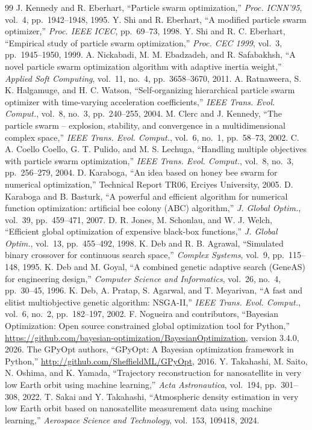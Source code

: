 \documentclass[11pt,a4paper]{article}
\begin{document}
\begin{thebibliography}{99}
 J. Kennedy and R. Eberhart, ``Particle swarm optimization,'' \textit{Proc. ICNN'95}, vol.~4, pp.~1942--1948, 1995.
 Y. Shi and R. Eberhart, ``A modified particle swarm optimizer,'' \textit{Proc. IEEE ICEC}, pp.~69--73, 1998.
 Y. Shi and R. C. Eberhart, ``Empirical study of particle swarm optimization,'' \textit{Proc. CEC 1999}, vol.~3, pp.~1945--1950, 1999.
 A. Nickabadi, M. M. Ebadzadeh, and R. Safabakhsh, ``A novel particle swarm optimization algorithm with adaptive inertia weight,'' \textit{Applied Soft Computing}, vol.~11, no.~4, pp.~3658--3670, 2011.
 A. Ratnaweera, S. K. Halgamuge, and H. C. Watson, ``Self-organizing hierarchical particle swarm optimizer with time-varying acceleration coefficients,'' \textit{IEEE Trans. Evol. Comput.}, vol.~8, no.~3, pp.~240--255, 2004.
 M. Clerc and J. Kennedy, ``The particle swarm -- explosion, stability, and convergence in a multidimensional complex space,'' \textit{IEEE Trans. Evol. Comput.}, vol.~6, no.~1, pp.~58--73, 2002.
 C. A. Coello Coello, G. T. Pulido, and M. S. Lechuga, ``Handling multiple objectives with particle swarm optimization,'' \textit{IEEE Trans. Evol. Comput.}, vol.~8, no.~3, pp.~256--279, 2004.
 D. Karaboga, ``An idea based on honey bee swarm for numerical optimization,'' Technical Report TR06, Erciyes University, 2005.
 D. Karaboga and B. Basturk, ``A powerful and efficient algorithm for numerical function optimization: artificial bee colony (ABC) algorithm,'' \textit{J. Global Optim.}, vol.~39, pp.~459--471, 2007.
 D. R. Jones, M. Schonlau, and W. J. Welch, ``Efficient global optimization of expensive black-box functions,'' \textit{J. Global Optim.}, vol.~13, pp.~455--492, 1998.
 K. Deb and R. B. Agrawal, ``Simulated binary crossover for continuous search space,'' \textit{Complex Systems}, vol.~9, pp.~115--148, 1995.
 K. Deb and M. Goyal, ``A combined genetic adaptive search (GeneAS) for engineering design,'' \textit{Computer Science and Informatics}, vol.~26, no.~4, pp.~30--45, 1996.
 K. Deb, A. Pratap, S. Agarwal, and T. Meyarivan, ``A fast and elitist multiobjective genetic algorithm: NSGA-II,'' \textit{IEEE Trans. Evol. Comput.}, vol.~6, no.~2, pp.~182--197, 2002.
 F. Nogueira and contributors, ``Bayesian Optimization: Open source constrained global optimization tool for Python,'' \url{https://github.com/bayesian-optimization/BayesianOptimization}, version 3.4.0, 2026.
 The GPyOpt authors, ``GPyOpt: A Bayesian optimization framework in Python,'' \url{http://github.com/SheffieldML/GPyOpt}, 2016.
 Y. Takahashi, M. Saito, N. Oshima, and K. Yamada, ``Trajectory reconstruction for nanosatellite in very low Earth orbit using machine learning,'' \textit{Acta Astronautica}, vol.~194, pp.~301--308, 2022.
 T. Sakai and Y. Takahashi, ``Atmospheric density estimation in very low Earth orbit based on nanosatellite measurement data using machine learning,'' \textit{Aerospace Science and Technology}, vol.~153, 109418, 2024.
\end{thebibliography}
\end{document}
